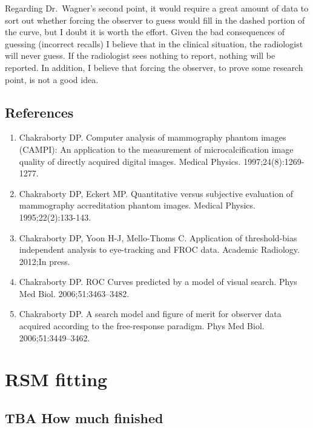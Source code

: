 \documentclass[
]{book}
\providecommand{\tightlist}{%
  \setlength{\itemsep}{0pt}\setlength{\parskip}{0pt}}
\begin{document}
Regarding Dr.~Wagner's second point, it would require a great amount of data to sort out whether forcing the observer to guess would fill in the dashed portion of the curve, but I doubt it is worth the effort. Given the bad consequences of guessing (incorrect recalls) I believe that in the clinical situation, the radiologist will never guess. If the radiologist sees nothing to report, nothing will be reported. In addition, I believe that forcing the observer, to prove some research point, is not a good idea.

\hypertarget{rsm-sc-references}{%
\section{References}\label{rsm-sc-references}}

\begin{enumerate}
\def\labelenumi{\arabic{enumi}.}
\tightlist
\item
  Chakraborty DP. Computer analysis of mammography phantom images (CAMPI): An application to the measurement of microcalcification image quality of directly acquired digital images. Medical Physics. 1997;24(8):1269-1277.
\item
  Chakraborty DP, Eckert MP. Quantitative versus subjective evaluation of mammography accreditation phantom images. Medical Physics. 1995;22(2):133-143.
\item
  Chakraborty DP, Yoon H-J, Mello-Thoms C. Application of threshold-bias independent analysis to eye-tracking and FROC data. Academic Radiology. 2012;In press.
\item
  Chakraborty DP. ROC Curves predicted by a model of visual search. Phys Med Biol. 2006;51:3463--3482.
\item
  Chakraborty DP. A search model and figure of merit for observer data acquired according to the free-response paradigm. Phys Med Biol. 2006;51:3449--3462.
\end{enumerate}

\hypertarget{rsm-fitting}{%
\chapter{RSM fitting}\label{rsm-fitting}}

\hypertarget{rsm-fitting-how-much-finished}{%
\section{TBA How much finished}\label{rsm-fitting-how-much-finished}}
\end{document}
